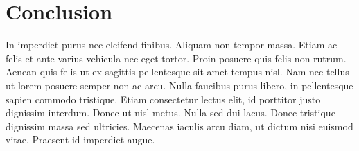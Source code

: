 
\section{Conclusion}
\label{sec:application_conclusion}

In imperdiet purus nec eleifend finibus. Aliquam non tempor massa. Etiam ac felis et ante varius vehicula nec eget tortor. Proin posuere quis felis non rutrum. Aenean quis felis ut ex sagittis pellentesque sit amet tempus nisl. Nam nec tellus ut lorem posuere semper non ac arcu. Nulla faucibus purus libero, in pellentesque sapien commodo tristique. Etiam consectetur lectus elit, id porttitor justo dignissim interdum. Donec ut nisl metus. Nulla sed dui lacus. Donec tristique dignissim massa sed ultricies. Maecenas iaculis arcu diam, ut dictum nisi euismod vitae. Praesent id imperdiet augue.

